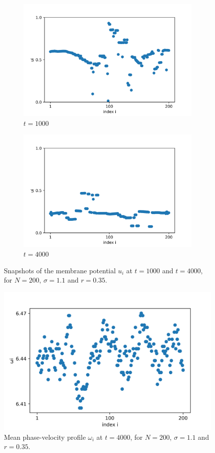 \documentclass[a4paper,12pt]{article}
\begin{document}
\begin{figure}[H]
\begin{subfigure}{0.49 \textwidth}
\centering
\includegraphics[width=\linewidth]{u_N=200_sigma=1.4_t=1000.png}
\caption{$t=1000$}
\end{subfigure}
\hfill
\begin{subfigure}{0.49 \textwidth}
\includegraphics[width = \linewidth]{u_N=200_sigma=1.4_t=4000.png}
\caption{$t=4000$}
\end{subfigure}
\caption{Snapshots of the membrane potential $u_i$ at $t=1000$ and $t=4000$, for $N=200$, $\sigma=1.1$ and $r=0.35$.}
\label{1.4}
\end{figure}

\begin{figure}[H]
\centering
\includegraphics[width = 0.6 \textwidth]{w_N=200_sigma=1.4_t=4000.png}
\caption{Mean phase-velocity profile $\omega_i$ at $t=4000$, for $N=200$, $\sigma=1.1$ and $r=0.35$.}
\label{1.4omega}
\end{figure}
\end{document}
